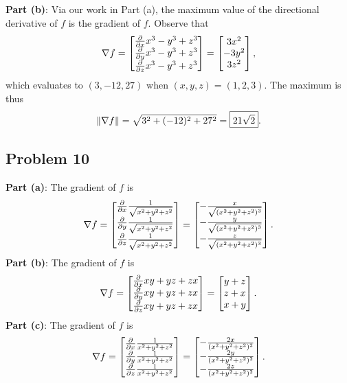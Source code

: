 \documentclass[11pt]{article}
\renewcommand{\grad}{\nabla}
\begin{document}
\textbf{Part (b)}: Via our work in Part (a), the maximum value of the directional derivative of $f$ is the gradient of $f$. Observe that
\[
	\grad f = \begin{bmatrix} \pdv{x} x^{3} - y^{3} + z^{3} \\ \pdv{y} x^{3} - y^{3} + z^{3} \\ \pdv{z} x^{3} - y^{3} + z^{3} \end{bmatrix} = \begin{bmatrix} 3x^{2} \\ -3y^{2} \\ 3z^{2} \end{bmatrix},
\]
which evaluates to $(3, -12, 27)$ when $(x, y, z) = (1, 2, 3)$. The maximum is thus
\[
	\norm{\grad f} = \sqrt{3^{2} + (-12)^{2} + 27^{2}} = \boxed{21 \sqrt{2}}.
\]


\subsection{Problem 10}

\textbf{Part (a)}: The gradient of $f$ is
\[
	\grad f = \begin{bmatrix} \pdv{x} \frac{1}{\sqrt{x^{2} + y^{2} + z^{2}}} \\ \pdv{y} \frac{1}{\sqrt{x^{2} + y^{2} + z^{2}}} \\ \pdv{z} \frac{1}{\sqrt{x^{2} + y^{2} + z^{2}}} \end{bmatrix} = \begin{bmatrix} -\frac{x}{\sqrt{(x^{2} + y^{2} + z^{2})^{3}}} \\ -\frac{y}{\sqrt{(x^{2} + y^{2} + z^{2})^{3}}} \\ -\frac{z}{\sqrt{(x^{2} + y^{2} + z^{2})^{3}}} \end{bmatrix}.
\]
\textbf{Part (b)}: The gradient of $f$ is
\[
	\grad f = \begin{bmatrix} \pdv{x} xy + yz + zx \\ \pdv{y} xy + yz + zx \\ \pdv{z} xy + yz + zx \end{bmatrix} = \begin{bmatrix} y + z \\ z + x \\ x + y \end{bmatrix}.
\]
\textbf{Part (c)}: The gradient of $f$ is
\[
	\grad f = \begin{bmatrix} \pdv{x} \frac{1}{x^{2} + y^{2} + z^{2}} \\ \pdv{y} \frac{1}{x^{2} + y^{2} + z^{2}} \\ \pdv{z} \frac{1}{x^{2} + y^{2} + z^{2}} \end{bmatrix} = \begin{bmatrix} -\frac{2x}{(x^{2} + y^{2} + z^{2})^{2}} \\ -\frac{2y}{(x^{2} + y^{2} + z^{2})^{2}} \\ -\frac{2z}{(x^{2} + y^{2} + z^{2})^{2}} \end{bmatrix}.
\]
\end{document}
